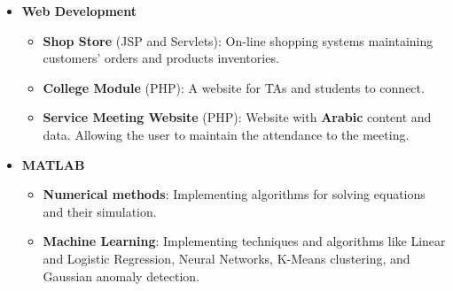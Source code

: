 \documentclass{res}
\begin{document}
\begin{resume}
\begin{itemize}
	\item \textbf{Web Development}
		\begin{itemize}
		\item \textbf{Shop Store} (JSP and Servlets): On-line shopping systems maintaining customers' orders and products inventories.
		\item \textbf{College Module} (PHP): A website for TAs and students to connect.
		\item \textbf{Service Meeting Website} (PHP): Website with \textbf{Arabic} content and data. Allowing the user to maintain the attendance to the meeting.
		\end{itemize}

	\item \textbf{MATLAB} 
		\begin{itemize}
		\item \textbf{Numerical methods}: Implementing algorithms for solving equations and their simulation.
		\item \textbf{Machine Learning}: Implementing techniques and algorithms like Linear and Logistic Regression, Neural Networks, K-Means clustering, and Gaussian anomaly detection.
		\end{itemize}
	\end{itemize}


\end{resume}
\end{document}
